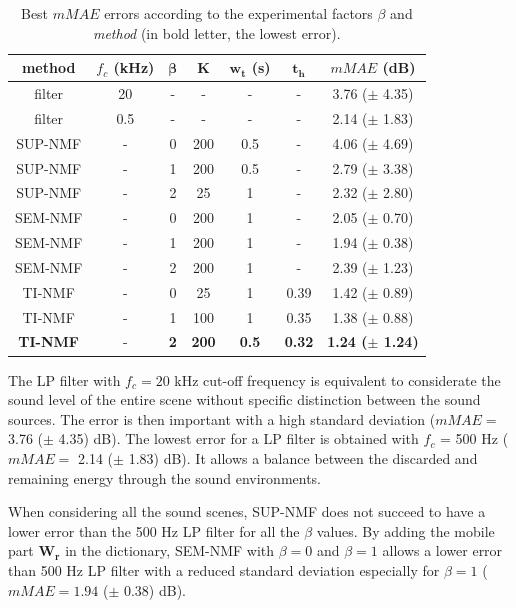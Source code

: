 \documentclass[review,5p,twocolumn,sort&compress,times]{elsarticle}
\begin{document}
\begin{table}[t]
\centering
\caption{Best $mMAE$ errors according to the experimental factors $\beta$ and \textit{method} (in bold letter, the lowest error).}
\begin{tabular}{@{}ccccccc@{}}
\toprule
\textbf{method} & $f_c$ (kHz) & $\mathbf{\beta}$ & $\mathbf{K}$ & $\mathbf{w_t}$ (s) &  $\mathbf{t_h}$ &  \textbf{$mMAE$} (dB) \\ \midrule
filter & 20 & - & - & - & - & 3.76 ($\pm$ 4.35) \\
filter & 0.5 & - & - & - & - & 2.14 ($\pm$ 1.83) \\ 
\hline \hline
SUP-NMF & - & 0 & 200 & 0.5 & - & 4.06 ($\pm$ 4.69) \\
SUP-NMF & - & 1 & 200 & 0.5 & - & 2.79 ($\pm$ 3.38) \\
SUP-NMF & - & 2 & 25 & 1 & - & 2.32  ($\pm$ 2.80) \\ 
\hline \hline
SEM-NMF & - & 0 & 200 & 1 & - & 2.05 ($\pm$ 0.70) \\
SEM-NMF & - & 1 & 200 & 1 & - & 1.94 ($\pm$ 0.38) \\
SEM-NMF & - & 2 & 200 & 1 & - & 2.39 ($\pm$ 1.23) \\ 
\hline \hline
TI-NMF & - & 0 & 25 & 1 & 0.39 & 1.42 ($\pm$ 0.89)\\
TI-NMF & - & 1 & 100 & 1 & 0.35 & 1.38 ($\pm$ 0.88)\\
\textbf{TI-NMF }& - & \textbf{2} & \textbf{200} & \textbf{0.5} & \textbf{0.32} & \textbf{1.24 ($\pm$ 1.24)}\\
\bottomrule
\end{tabular}
\label{tab:results}
\end{table}

The LP filter with $f_c = 20$ kHz cut-off frequency is equivalent to considerate the sound level of the entire scene without specific distinction between the sound sources. The error is then important with a high standard deviation ($mMAE =$ 3.76 ($\pm$ 4.35) dB). The lowest error for a LP filter is obtained with $f_c$ = 500 Hz ($mMAE =$ 2.14 ($\pm$ 1.83) dB). It allows a balance between the discarded and remaining energy through the sound environments.

When considering all the sound scenes, SUP-NMF does not succeed to have a lower error than the 500 Hz LP filter for all the $\beta$ values. By adding the mobile part $\mathbf{W_r}$ in the dictionary, SEM-NMF with $\beta = 0$ and $\beta = 1$ allows a lower error than 500 Hz LP filter with a reduced standard deviation especially for $\beta = 1$ ($mMAE = 1.94$ ($\pm$ 0.38) dB).
\end{document}

